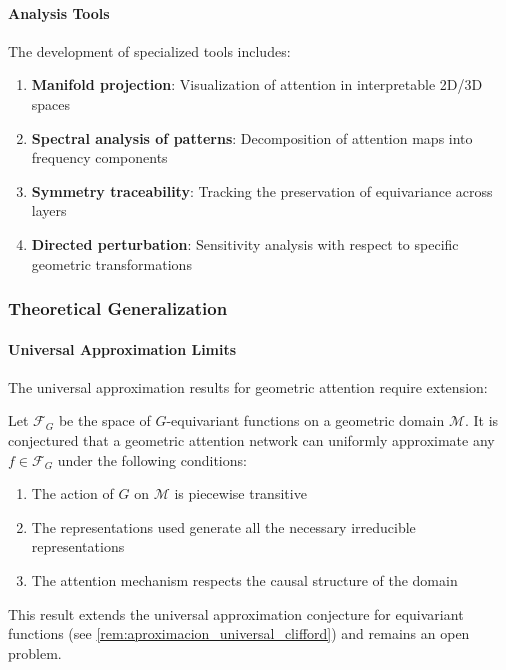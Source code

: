 \paragraph{Analysis Tools}

The development of specialized tools includes:

\begin{enumerate}
    \item \textbf{Manifold projection}: Visualization of attention in interpretable 2D/3D spaces
    \item \textbf{Spectral analysis of patterns}: Decomposition of attention maps into frequency components
    \item \textbf{Symmetry traceability}: Tracking the preservation of equivariance across layers
    \item \textbf{Directed perturbation}: Sensitivity analysis with respect to specific geometric transformations
\end{enumerate}

\subsubsection{Theoretical Generalization}

\paragraph{Universal Approximation Limits}

The universal approximation results for geometric attention require extension:

\begin{remark}
Let $\mathcal{F}_G$ be the space of $G$-equivariant functions on a geometric domain $\mathcal{M}$. It is conjectured that a geometric attention network can uniformly approximate any $f \in \mathcal{F}_G$ under the following conditions:
\begin{enumerate}
    \item The action of $G$ on $\mathcal{M}$ is piecewise transitive
    \item The representations used generate all the necessary irreducible representations
    \item The attention mechanism respects the causal structure of the domain
\end{enumerate}
This result extends the universal approximation conjecture for equivariant functions (see \autoref{rem:aproximacion_universal_clifford}) and remains an open problem.
\end{remark}

